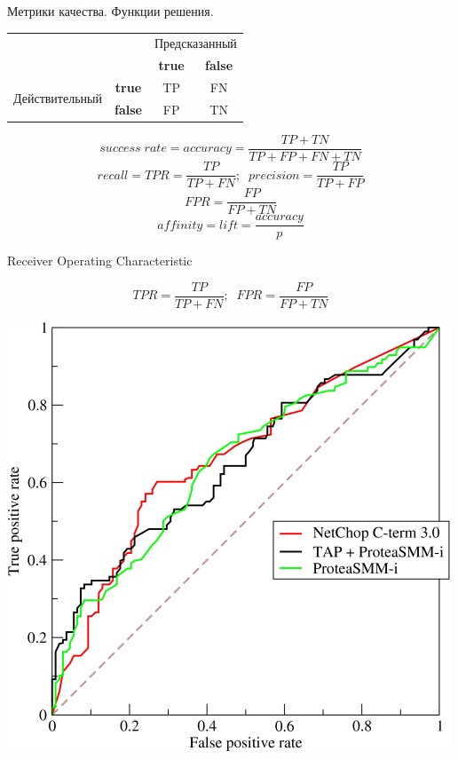 \documentclass[10pt]{beamer}
\begin{document}
\begin{frame}{Метрики качества. Функции решения.}

\begin{center}
\begin{tabular}{|c r | c c|}
\cline{3-4}
 \multicolumn{2}{c|}{} & \multicolumn{2}{c|}{Предсказанный} \\
 \cline{3-4}
 \multicolumn{2}{c|}{} & {\bf true} & {\bf false} \\
 \hline
 \multirow{2}{*}{Действительный} & \multicolumn{1}{|c|}{\bf true} & TP & FN \\
 & \multicolumn{1}{|c|}{\bf false}  & FP & TN \\
 \hline
\end{tabular}
\end{center}

\[
success\;rate = accuracy = \frac{TP + TN}{TP + FP + FN + TN}
\]
\[
recall = TPR = \frac{TP}{TP + FN};\;\;precision = \frac{TP}{TP + FP}
\]
\[
FPR = \frac{FP}{FP + TN}
\]
\[
affinity = lift = \frac{accuracy}{p}
\]

\end{frame}


\begin{frame}{Receiver Operating Characteristic}

\[
TPR = \frac{TP}{TP + FN};\;\;FPR = \frac{FP}{FP + TN}
\]

\begin{center}
\includegraphics[scale=2.0]{images/roc.png}
\end{center}

\end{frame}
\end{document}
